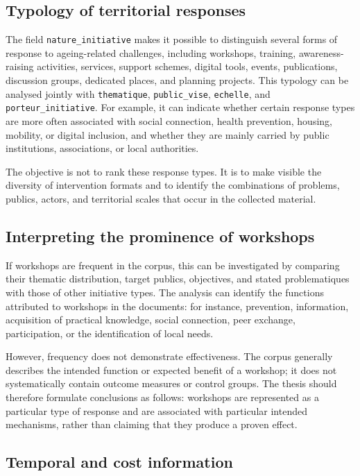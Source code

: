 \documentclass[
11pt,
english,
singlespacing,
headsepline,
]{MastersDoctoralThesis}
\begin{document}
\subsection{Typology of territorial responses}

The field \texttt{nature\_initiative} makes it possible to distinguish several
forms of response to ageing-related challenges, including workshops, training,
awareness-raising activities, services, support schemes, digital tools, events,
publications, discussion groups, dedicated places, and planning projects. This
typology can be analysed jointly with \texttt{thematique},
\texttt{public\_vise}, \texttt{echelle}, and \texttt{porteur\_initiative}.
For example, it can indicate whether certain response types are more often
associated with social connection, health prevention, housing, mobility, or
digital inclusion, and whether they are mainly carried by public institutions,
associations, or local authorities.

The objective is not to rank these response types. It is to make visible the
diversity of intervention formats and to identify the combinations of problems,
publics, actors, and territorial scales that occur in the collected material.

\subsection{Interpreting the prominence of workshops}

If workshops are frequent in the corpus, this can be investigated by comparing
their thematic distribution, target publics, objectives, and stated
problematiques with those of other initiative types. The analysis can identify
the functions attributed to workshops in the documents: for instance,
prevention, information, acquisition of practical knowledge, social connection,
peer exchange, participation, or the identification of local needs.

However, frequency does not demonstrate effectiveness. The corpus generally
describes the intended function or expected benefit of a workshop; it does not
systematically contain outcome measures or control groups. The thesis should
therefore formulate conclusions as follows: workshops are represented as a
particular type of response and are associated with particular intended
mechanisms, rather than claiming that they produce a proven effect.

\subsection{Temporal and cost information}
\end{document}
